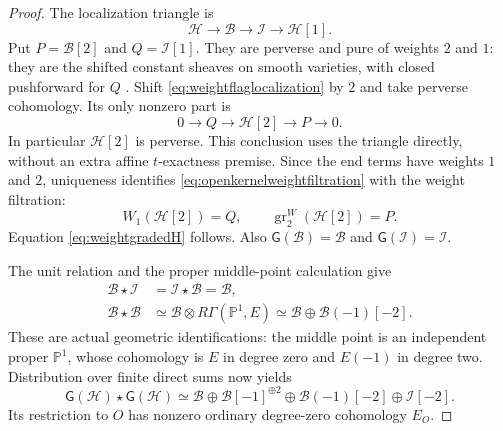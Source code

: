\documentclass[11pt,a4paper]{article}
\renewcommand{\S}{\ensuremath{\mathsection}}
\theoremstyle{named}\newtheorem{finding}{Finding}[section]
\theoremstyle{definition}\newtheorem{definition}[finding]{Definition}
\theoremstyle{remark}\newtheorem{remark}[finding]{Remark}
\begin{document}
\begin{proof}
The localization triangle is
\begin{equation}\label{eq:weightflaglocalization}
 \mathcal H\longrightarrow\mathcal B
       \longrightarrow\mathcal I\longrightarrow\mathcal H[1].
\end{equation}
Put \(P=\mathcal B[2]\) and \(Q=\mathcal I[1]\).
They are perverse and pure of weights \(2\) and \(1\):
they are the shifted constant sheaves on smooth varieties,
with closed pushforward for \(Q\)
\cite[\S4.0, p.~102; 5.1.8, pp.~126--127]{BBD}.
Shift \eqref{eq:weightflaglocalization} by \(2\) and take
perverse cohomology. Its only nonzero part is
\begin{equation}\label{eq:openkernelweightfiltration}
 0\longrightarrow Q\longrightarrow\mathcal H[2]
     \longrightarrow P\longrightarrow0.
\end{equation}
In particular \(\mathcal H[2]\) is perverse. This conclusion
uses the triangle directly, without an extra affine
\(t\)-exactness premise. Since the end terms have weights
\(1\) and \(2\), uniqueness identifies
\eqref{eq:openkernelweightfiltration} with the weight
filtration:
\[
 W_1(\mathcal H[2])=Q,\qquad
 \operatorname{gr}^W_2(\mathcal H[2])=P.
\]
Equation \eqref{eq:weightgradedH} follows. Also
\(\mathsf G(\mathcal B)=\mathcal B\) and
\(\mathsf G(\mathcal I)=\mathcal I\).

The unit relation and the proper middle-point calculation give
\begin{equation}\label{eq:closedflagkernelrelation}
 \begin{split}
 \mathcal B\star\mathcal I
   &=\mathcal I\star\mathcal B=\mathcal B,\\
 \mathcal B\star\mathcal B
   &\simeq\mathcal B\otimes R\Gamma(\mathbb P^1,E)
     \simeq\mathcal B\oplus\mathcal B(-1)[-2].
 \end{split}
\end{equation}
These are actual geometric identifications: the middle point
is an independent proper \(\mathbb P^1\), whose cohomology is
\(E\) in degree zero and \(E(-1)\) in degree two.
Distribution over finite direct sums now yields
\begin{equation}\label{eq:productofweightgradedH}
 \mathsf G(\mathcal H)\star\mathsf G(\mathcal H)
  \simeq
   \mathcal B\oplus\mathcal B[-1]^{\oplus2}
      \oplus\mathcal B(-1)[-2]\oplus\mathcal I[-2].
\end{equation}
Its restriction to \(O\) has nonzero ordinary degree-zero
cohomology \(E_O\).


\end{proof}
\end{document}
